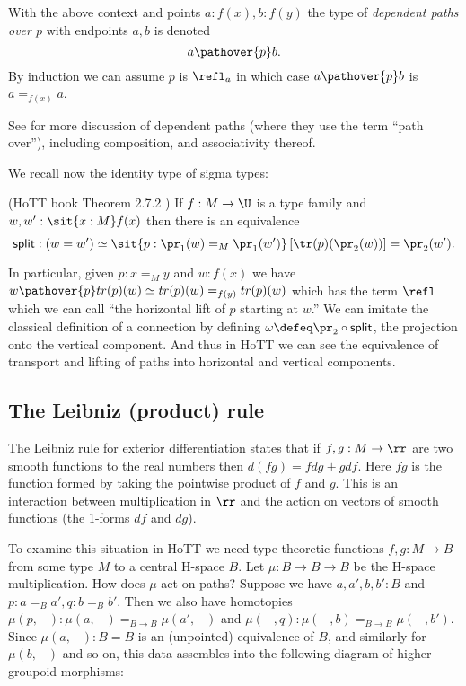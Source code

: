 \begin{mydef}
With the above context and points \( a:f(x), b:f(y) \) the type of \emph{dependent paths over \( p \)} with endpoints \( a, b \) is denoted
\[ a\pathover{p}b.
\]
By induction we can assume \( p \) is \( \refl_a \) in which case \( a\pathover{p}b \) is \( a=_{f(x)}a \).
\end{mydef}

See \cite{Symmetry} for more discussion of dependent paths (where they
use the term ``path over''), including composition, and associativity
thereof.

We recall now the identity type of sigma types:

\begin{mythm}\label{thm:idsit}
(HoTT book Theorem 2.7.2 \cite{hottbook}) If \( f:M\to \U \) is a type family and \( w,w':\sit{x:M}f(x) \) then there is an equivalence 
\[ 
\mathsf{split}:(w=w')\simeq \sit{p:\pr_1(w)=_M\pr_1(w')} \left[\tr(p)(\pr_2(w))\right] = \pr_2(w').
\]
\end{mythm}

In particular, given \(p:x=_M y\) and \(w:f(x)\) we have
\(w\pathover{p}tr(p)(w)\simeq tr(p)(w)=_{f(y)}tr(p)(w)\) which has the
term \(\refl\) which we can call ``the horizontal lift of \(p\) starting
at \(w\).'' We can imitate the classical definition of a connection by
defining \(\omega\defeq \pr_2\circ\mathsf{split}\), the projection onto
the vertical component. And thus in HoTT we can see the equivalence of
transport and lifting of paths into horizontal and vertical components.

\subsection{The Leibniz (product) rule}\label{the-leibniz-product-rule}

The Leibniz rule for exterior differentiation states that if
\(f, g:M\to \rr\) are two smooth functions to the real numbers then
\(d(fg) = fdg + gdf\). Here \(fg\) is the function formed by taking the
pointwise product of \(f\) and \(g\). This is an interaction between
multiplication in \(\rr\) and the action on vectors of smooth functions
(the 1-forms \(df\) and \(dg\)).

To examine this situation in HoTT we need type-theoretic functions
\(f, g:M\to B\) from some type \(M\) to a central H-space \(B\). Let
\(\mu:B\to B\to B\) be the H-space multiplication. How does \(\mu\) act
on paths? Suppose we have \(a, a', b, b':B\) and
\(p:a=_B a', q:b=_B b'\). Then we also have homotopies
\(\mu(p, -):\mu(a, -)=_{B\to B}\mu(a', -)\) and
\(\mu(-,q):\mu(-,b)=_{B\to B}\mu(-,b').\) Since \(\mu(a, -):B=B\) is an
(unpointed) equivalence of \(B\), and similarly for \(\mu(b, -)\) and so
on, this data assembles into the following diagram of higher groupoid
morphisms:

